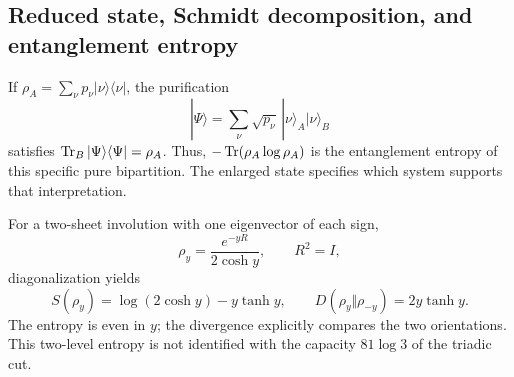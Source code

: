 

\subsection{Reduced state, Schmidt decomposition, and entanglement entropy}
If $\rho_A=\sum_\nu p_\nu|\nu\rangle\langle\nu|$,
the purification
\[
|\Psi\rangle=\sum_\nu\sqrt{p_\nu}\,
|\nu\rangle_A|\nu\rangle_B
\]
satisfies $\operatorname{Tr}_B|\Psi\rangle\langle\Psi|=\rho_A$.
Thus, $-\operatorname{Tr}(\rho_A\log\rho_A)$ is the entanglement entropy
of this specific pure bipartition. The enlarged state specifies
which system supports that interpretation.

For a two-sheet involution with one eigenvector of each sign,
\[
\rho_y=\frac{e^{-yR}}{2\cosh y},\qquad R^2=I,
\]
diagonalization yields
\[
S(\rho_y)=\log(2\cosh y)-y\tanh y,\qquad
D(\rho_y\Vert\rho_{-y})=2y\tanh y.
\]
The entropy is even in $y$; the divergence explicitly compares
the two orientations. This two-level entropy is not identified
with the capacity $81\log3$ of the triadic cut.
